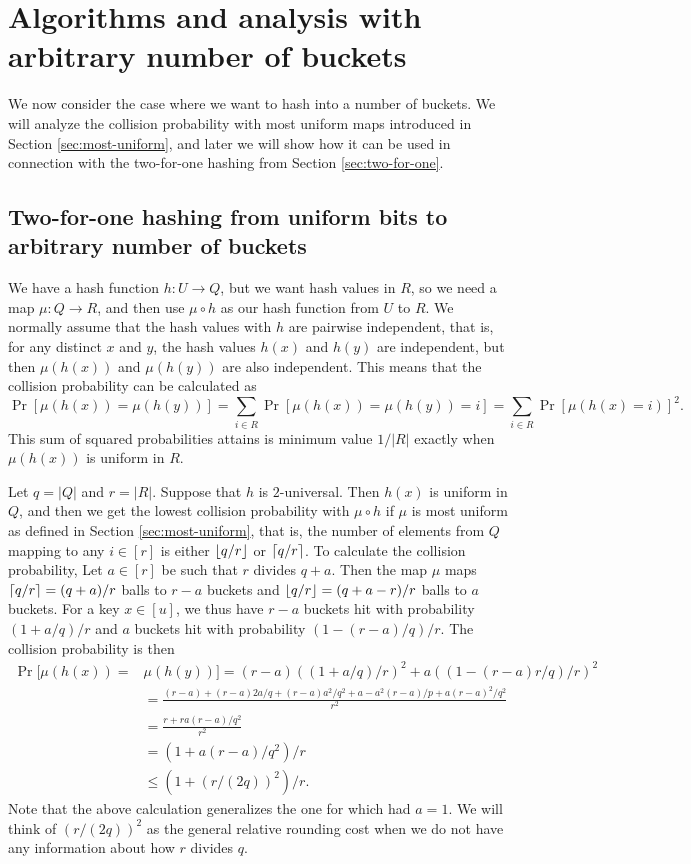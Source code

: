 
\section{Algorithms and analysis with arbitrary number of buckets}
We now consider the case where we want to hash into
a number of buckets. We will analyze the collision probability
with most uniform maps introduced in Section \ref{sec:most-uniform},
and later we will show how it can be used in connection with the
two-for-one hashing from Section \ref{sec:two-for-one}.

\subsection{Two-for-one hashing from uniform bits to arbitrary number of buckets}
We have a hash function $h:U\to Q$, but we want hash values in $R$, so
we need a map $\mu:Q\to R$, and then use $\mu\circ h$ as
our hash function from $U$ to $R$. We normally assume that the hash values 
with $h$ are pairwise independent, that is, for any distinct $x$ and $y$,
the hash values $h(x)$ and $h(y)$ are independent, but then 
$\mu(h(x))$ and $\mu(h(y))$ are also independent. This means
that the collision probability can be calculated
as 
\[\Pr[\mu(h(x))=\mu(h(y))]=\sum_{i\in R}\Pr[\mu(h(x))=\mu(h(y))=i]=\sum_{i\in R}\Pr[\mu(h(x)=i)]^2.\]
This sum of squared probabilities attains is minimum value $1/|R|$
exactly when $\mu(h(x))$ is uniform in $R$. 

Let $q=|Q|$ and $r=|R|$. Suppose that $h$ is $2$-universal. Then
$h(x)$ is uniform in $Q$, and then we get the lowest collision
probability with $\mu\circ h$ if $\mu$ is most uniform as defined in
Section \ref{sec:most-uniform}, that is, the number of elements from
$Q$ mapping to any $i\in[r]$ is either $\lfloor {q/r} \rfloor$ or
$\lceil {q/r}\rceil$. To calculate the collision probability,
Let $a\in[r]$ be such that $r$ divides $q+a$. Then the map $\mu$ maps
$\lceil {q/r}\rceil=(q+a)/r$ balls to $r-a$ buckets and
$\lfloor {q/r} \rfloor=(q+a-r)/r$ balls to $a$ buckets. For a key $x\in [u]$, we
thus have $r-a$ buckets hit with probability $(1+a/q)/r$ and
$a$ buckets hit with probability $(1-(r-a)/q)/r$.
The collision probability is then
\begin{equation}\begin{split}
   \Pr[\mu(h(x))=&\mu(h(y))]= (r-a)((1+a/q)/r)^2+a((1-(r-a)r/q)/r)^2
                 \\&=\frac{(r-a)+(r-a)2a/q+(r-a)a^2/q^2+ a-a^2(r-a)/p+a(r-a)^2/q^2}{r^2}
                 \\&=\frac{r +r a (r-a)/q^2}{r^2}
                 \\&=(1+a(r-a)/q^2)/r
                 \\&\le \left(1+(r/(2q))^2\right)/r.\label{eq:coll-a}
\end{split}\end{equation}
Note that the above calculation generalizes the one for  which
had $a=1$. We will think of $(r/(2q))^2$ as the general relative rounding
cost when we do not have any information about how $r$ divides $q$.

